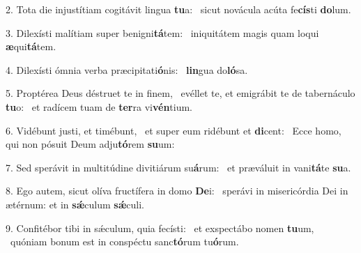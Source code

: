 2. Tota die injustítiam cogitávit lingua \textbf{tu}a: \ast\  sicut novácula acúta fe\textbf{cís}ti \textbf{do}lum.\

3. Dilexísti malítiam super benigni\textbf{tá}tem: \ast\  iniquitátem magis quam loqui \textbf{æ}qui\textbf{tá}tem.\

4. Dilexísti ómnia verba præcipitati\textbf{ó}nis: \ast\  \textbf{lin}gua do\textbf{ló}sa.\

5. Proptérea Deus déstruet te in finem, \dag\  evéllet te, et emigrábit te de tabernáculo \textbf{tu}o: \ast\  et radícem tuam de \textbf{ter}ra vi\textbf{vén}tium.\

6. Vidébunt justi, et timébunt, \dag\  et super eum ridébunt et \textbf{di}cent: \ast\  Ecce homo, qui non pósuit Deum adju\textbf{tó}rem \textbf{su}um:\

7. Sed sperávit in multitúdine divitiárum su\textbf{á}rum: \ast\  et præváluit in vani\textbf{tá}te \textbf{su}a.\

8. Ego autem, sicut olíva fructífera in domo \textbf{De}i: \ast\  sperávi in misericórdia Dei in ætérnum: et in \textbf{sǽ}culum \textbf{sǽ}culi.\

9. Confitébor tibi in sǽculum, quia fecísti: \dag\  et exspectábo nomen \textbf{tu}um, \ast\  quóniam bonum est in conspéctu sanc\textbf{tó}rum tu\textbf{ó}rum.\

